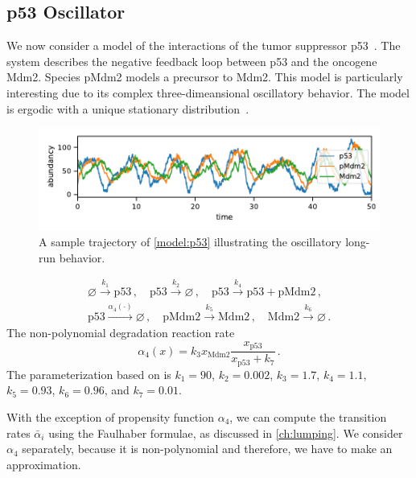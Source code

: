 \subsection{p53 Oscillator}
We now consider a model of the interactions of the tumor suppressor
p53~\parencite{geva2006oscillations}. The system describes the
negative feedback loop between  p53 and the oncogene Mdm2.
Species pMdm2 models a precursor to Mdm2. This model is particularly
interesting due to its complex three-di\-mea\-nsional oscillatory behavior.
The model is ergodic with a unique stationary
distribution~\parencite{gupta2014scalable}.
\begin{figure}[htb]
  \centering
  \includegraphics[width=\textwidth]{gfx/p53_traj.pdf}
  \caption[Sample trajectory (p53)]{A sample trajectory of
  \autoref{model:p53} illustrating the oscillatory long-run behavior. }
  \label{fig:p53:traj}
\end{figure}
\begin{model}[p53 Oscillator]\label{model:p53}
  \begin{gather*}
    \varnothing \xrightarrow{k_1} \mathrm{p53} \,,\quad
    \mathrm{p53} \xrightarrow{k_2} \varnothing \,,\quad
    \mathrm{p53} \xrightarrow{k_4} \mathrm{p53} + \mathrm{pMdm2}\,,\\
    \mathrm{p53} \xrightarrow{\alpha_4(\cdot)} \varnothing \,,\quad
    \mathrm{pMdm2} \xrightarrow{k_5} \mathrm{Mdm2} \,,\quad
    \mathrm{Mdm2} \xrightarrow{k_6} \varnothing\,.
  \end{gather*}
  The non-polynomial degradation reaction rate
  \[
    \alpha_4(x) =k_3 x_{\mathrm{Mdm2}}
    \frac{x_{\mathrm{p53}}}{x_{\mathrm{p53}} + k_7}\,.
  \]
  The parameterization based on \parencite{ale2013general} is
  $k_1=90$, $k_2=0.002$, $k_3=1.7$, $k_4=1.1$, $k_5=0.93$,
  $k_6=0.96$, and $k_7 = 0.01$.
\end{model}
With the exception of propensity function $\alpha_4$, we can compute
the transition rates ${\bar{\alpha}}_i$ using the Faulhaber formulae,
as discussed in \autoref{ch:lumping}.
We consider $\alpha_4$ separately, because it is non-polynomial and
therefore, we have to make an approximation.
